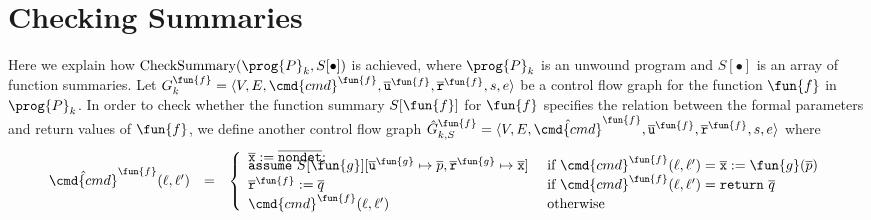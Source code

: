 
\section{Checking Summaries}\label{sec:checking-summary}

Here we explain how $\textmd{CheckSummary} (\prog{P}_k, S[\bullet])$ is achieved,
where $\prog{P}_k$ is an unwound program and $S[\bullet]$ is an array of
function summaries.
Let $G^\fun{f}_k = \langle V, E, \cmd{cmd}^\fun{f}, \overline{\mathtt{u}}^\fun{f}, \overline{\mathtt{r}}^\fun{f},s,e \rangle$ be a
control flow graph for the function $\fun{f}$ in $\prog{P}_k$. In order to check whether the function
summary $S[{\fun{f}}]$ for $\fun{f}$ specifies the relation
between the formal parameters and return values of $\fun{f}$,
we define another control flow graph
$\hat{G}^\fun{f}_{k,S} = \langle V, E, \hat{\cmd{cmd}}^\fun{f}, \overline{\mathtt{u}}^\fun{f}, \overline{\mathtt{r}}^\fun{f},s,e \rangle$ where
\begin{equation*}
  \begin{array}{rcl}
    \hat{\cmd{cmd}}^\fun{f} (\ell, \ell') & = &
    \left\{
      \begin{array}{ll}
        \overline{\mathtt{x}} := \overline{\mathtt{nondet}}; & \\[-8pt]

        \mathtt{assume\ }S[{\fun{g}}][
          \overline{\mathtt{u}}^\fun{g} \mapsto \overline{p},
          \overline{\mathtt{r}}^\fun{g} \mapsto \overline{\mathtt{x}}]
        & \text{ if } \cmd{cmd}^\fun{f} (\ell, \ell') =
          \overline{\mathtt{x}} := \fun{g} (\overline{p}) \\

        \overline{\mathtt{r}}^\fun{f} := \overline{q}
        & \text{ if } \cmd{cmd}^\fun{f} (\ell, \ell') =
          \mathtt{return\ }\overline{q} \\

        \cmd{cmd}^\fun{f} (\ell, \ell')
        & \text{ otherwise}
      \end{array}
    \right.
  \end{array}
\end{equation*}

